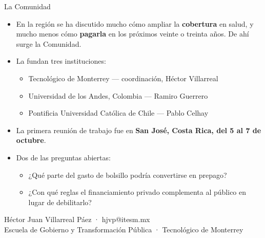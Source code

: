 \documentclass[aspectratio=169,10pt]{beamer}
\newcommand{\clave}[1]{{\color{marino}\bfseries #1}}
\begin{document}
\begin{frame}{La Comunidad}
  \vspace{0.5em}
  {\small
  \begin{itemize}\setlength{\itemsep}{0.4em}
    \item En la región se ha discutido mucho cómo ampliar la \clave{cobertura} en salud, y mucho menos cómo \clave{pagarla} en los próximos veinte o treinta años. De ahí surge la Comunidad.
    \item La fundan tres instituciones:
      \begin{itemize}
        \item Tecnológico de Monterrey --- coordinación, Héctor Villarreal
        \item Universidad de los Andes, Colombia --- Ramiro Guerrero
        \item Pontificia Universidad Católica de Chile --- Pablo Celhay
      \end{itemize}
    \item La primera reunión de trabajo fue en \clave{San José, Costa Rica, del 5 al 7 de octubre}.
    \item Dos de las preguntas abiertas:
      \begin{itemize}
        \item ¿Qué parte del gasto de bolsillo podría convertirse en prepago?
        \item ¿Con qué reglas el financiamiento privado complementa al público en lugar de debilitarlo?
      \end{itemize}
  \end{itemize}}
\end{frame}

\begin{frame}[plain]
  \vfill
  \noindent{}
  \begin{center}
  \vspace{1.6em}
  {\small Héctor Juan Villarreal Páez · hjvp@itesm.mx\\[0.2em]
  Escuela de Gobierno y Transformación Pública · Tecnológico de Monterrey\par}
  \end{center}
  \vfill
\end{frame}
\end{document}
